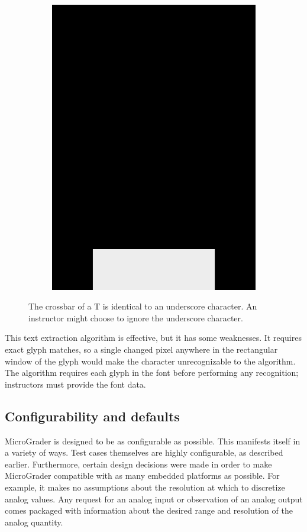\documentclass[12pt]{article}
\begin{document}
\begin{figure}
\begin{subfigure}[b]{.3\linewidth}
\includegraphics[width=\linewidth]{glyph-underscore.png}
\label{fig:glyph-underscore}
\end{subfigure}
\caption{The crossbar of a T is identical to an underscore character.  An instructor might choose to ignore the underscore character.}
\label{fig:bad-ocr}
\end{figure}

This text extraction algorithm is effective, but it has some weaknesses.  It requires exact glyph matches, so a single changed pixel anywhere in the rectangular window of the glyph would make the character unrecognizable to the algorithm.  The algorithm requires each glyph in the font before performing any recognition; instructors must provide the font data.

\subsection{Configurability and defaults}
\label{sec:config}
MicroGrader is designed to be as configurable as possible.  This manifests itself in a variety of ways.  Test cases themselves are highly configurable, as described earlier.  Furthermore, certain design decisions were made in order to make MicroGrader compatible with as many embedded platforms as possible.  For example, it makes no assumptions about the resolution at which to discretize analog values.  Any request for an analog input or observation of an analog output comes packaged with information about the desired range and resolution of the analog quantity.
\end{document}
